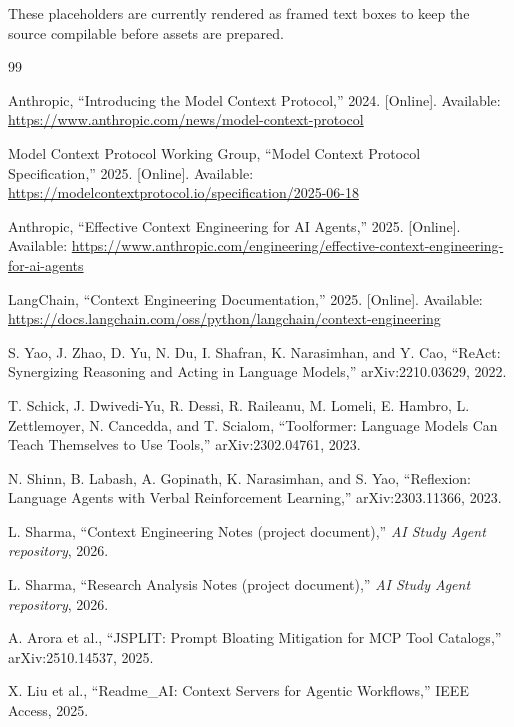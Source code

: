 \documentclass[conference]{IEEEtran}
\begin{document}
These placeholders are currently rendered as framed text boxes to keep the source compilable before assets are prepared.

\begin{thebibliography}{99}

Anthropic,
``Introducing the Model Context Protocol,''
2024.
[Online].
Available:
\url{https://www.anthropic.com/news/model-context-protocol}

Model Context Protocol Working Group,
``Model Context Protocol Specification,''
2025.
[Online].
Available:
\url{https://modelcontextprotocol.io/specification/2025-06-18}

Anthropic,
``Effective Context Engineering for AI Agents,''
2025.
[Online].
Available:
\url{https://www.anthropic.com/engineering/effective-context-engineering-for-ai-agents}

LangChain,
``Context Engineering Documentation,''
2025.
[Online].
Available:
\url{https://docs.langchain.com/oss/python/langchain/context-engineering}

S. Yao,
J. Zhao,
D. Yu,
N. Du,
I. Shafran,
K. Narasimhan,
and Y. Cao,
``ReAct: Synergizing Reasoning and Acting in Language Models,''
arXiv:2210.03629,
2022.

T. Schick,
J. Dwivedi-Yu,
R. Dessi,
R. Raileanu,
M. Lomeli,
E. Hambro,
L. Zettlemoyer,
N. Cancedda,
and T. Scialom,
``Toolformer: Language Models Can Teach Themselves to Use Tools,''
arXiv:2302.04761,
2023.

N. Shinn,
B. Labash,
A. Gopinath,
K. Narasimhan,
and S. Yao,
``Reflexion: Language Agents with Verbal Reinforcement Learning,''
arXiv:2303.11366,
2023.

L. Sharma,
``Context Engineering Notes (project document),''
\emph{AI Study Agent repository},
2026.

L. Sharma,
``Research Analysis Notes (project document),''
\emph{AI Study Agent repository},
2026.

A. Arora et al.,
``JSPLIT: Prompt Bloating Mitigation for MCP Tool Catalogs,''
arXiv:2510.14537,
2025.

X. Liu et al.,
``Readme\_AI: Context Servers for Agentic Workflows,''
IEEE Access,
2025.


\end{thebibliography}
\end{document}
